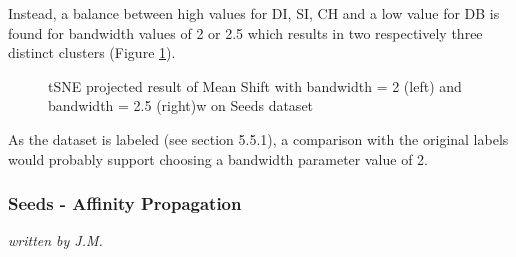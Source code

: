 \newline
Instead, a balance between high values for DI, SI, CH and a low value for DB is found for bandwidth values of 2 or 2.5 which results in two respectively three distinct clusters (Figure \ref{fig:meanshift_seeds_2_tsne}). 
\begin{figure}[!ht]
    \label{fig:meanshift_seeds_2_tsne}
    \caption{tSNE projected result of Mean Shift with bandwidth = 2 (left) and bandwidth = 2.5 (right)w on Seeds dataset}
\end{figure}
\newline
As the dataset is labeled (see section 5.5.1), a comparison with the original labels would probably support choosing a bandwidth parameter value of 2.

\subsubsection{Seeds - Affinity Propagation}
\textit{written by J.M.}\\

